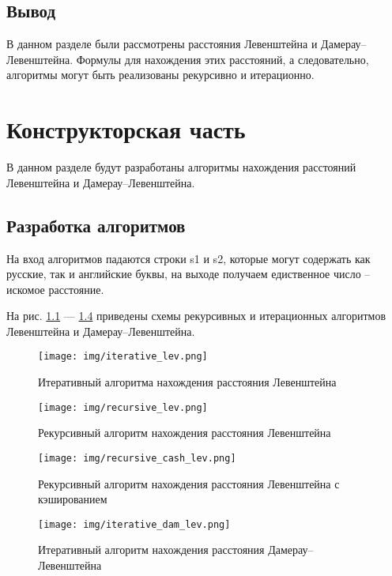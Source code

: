 \documentclass[a4paper,14pt, unknownkeysallowed]{extreport}
\begin{document}
\section*{Вывод}
В данном разделе были рассмотрены расстояния Левенштейна и Дамерау--Левенштейна. Формулы для нахождения этих расстояний, а следовательно, алгоритмы могут быть реализованы рекурсивно и итерационно.


\chapter{Конструкторская часть}
В данном разделе будут разработаны алгоритмы нахождения расстояний Левенштейна и Дамерау--Левенштейна.

\section{Разработка алгоритмов}

На вход алгоритмов падаются строки s1 и s2, которые могут содержать как русские, так и английские буквы, на выходе получаем едиственное число -- искомое расстояние.

На рис. \ref{fig:L_iter} --- \ref{fig:DL_iter} приведены схемы рекурсивных и итерационных алгоритмов Левенштейна и Дамерау--Левенштейна.

\clearpage

\begin{figure}[h]
	\centering
	\texttt{[image: img/iterative\_lev.png]}
	\caption{Итеративный алгоритма нахождения расстояния Левенштейна}
	\label{fig:L_iter}
\end{figure}

\clearpage

\begin{figure}[h]
	\centering
	\texttt{[image: img/recursive\_lev.png]}
	\caption{Рекурсивный алгоритм нахождения расстояния Левенштейна}
	\label{fig:L_recur}
\end{figure}

\clearpage

\begin{figure}[h]
	\centering
	\texttt{[image: img/recursive\_cash\_lev.png]}
	\caption{Рекурсивный алгоритм нахождения расстояния Левенштейна с кэшированием}
	\label{fig:L_rec_cash}
\end{figure}

\clearpage

\begin{figure}[h]
	\centering
	\texttt{[image: img/iterative\_dam\_lev.png]}
	\caption{Итеративный алгоритм нахождения расстояния Дамерау--Левенштейна}
	\label{fig:DL_iter}
\end{figure}
\end{document}
